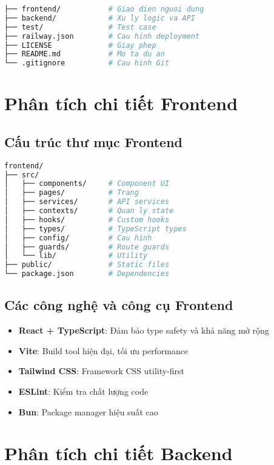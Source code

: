 \documentclass{book}
\let\oldsection\section
\renewcommand{\section}{\clearpage\oldsection}
\begin{document}
\begin{lstlisting}[language=bash]
├── frontend/           # Giao dien nguoi dung
├── backend/            # Xu ly logic va API
├── test/               # Test case
├── railway.json        # Cau hinh deployment
├── LICENSE             # Giay phep
├── README.md           # Mo ta du an
└── .gitignore          # Cau hinh Git
\end{lstlisting}

\section{Phân tích chi tiết Frontend}

\subsection{Cấu trúc thư mục Frontend}
\begin{lstlisting}[language=bash]
frontend/
├── src/
│   ├── components/     # Component UI
│   ├── pages/          # Trang
│   ├── services/       # API services
│   ├── contexts/       # Quan ly state
│   ├── hooks/          # Custom hooks
│   ├── types/          # TypeScript types
│   ├── config/         # Cau hinh
│   ├── guards/         # Route guards
│   └── lib/            # Utility
├── public/             # Static files
└── package.json        # Dependencies
\end{lstlisting}

\subsection{Các công nghệ và công cụ Frontend}
\begin{itemize}
    \item \textbf{React + TypeScript}: Đảm bảo type safety và khả năng mở rộng
    \item \textbf{Vite}: Build tool hiện đại, tối ưu performance
    \item \textbf{Tailwind CSS}: Framework CSS utility-first
    \item \textbf{ESLint}: Kiểm tra chất lượng code
    \item \textbf{Bun}: Package manager hiệu suất cao
\end{itemize}

\section{Phân tích chi tiết Backend}
\end{document}
